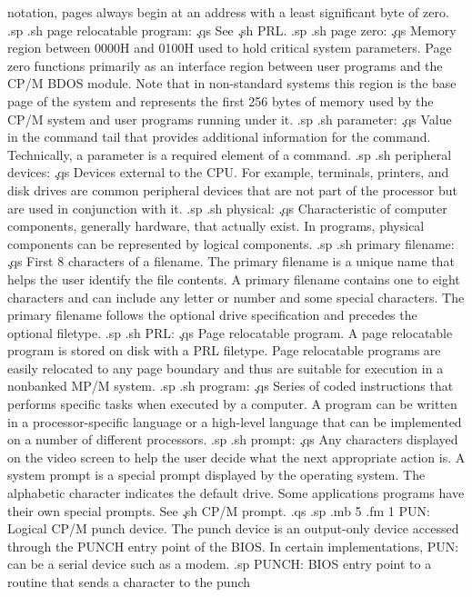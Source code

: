 notation, pages always begin at an address with a least 
significant byte of zero.
.sp
.sh
page relocatable program:  \c
.qs
See \c
.sh
PRL.
.sp
.sh
page zero:  \c
.qs
Memory region between 0000H and 0100H used to hold critical 
system parameters.  Page zero functions primarily as an interface 
region between user programs and the CP/M BDOS module.  Note that 
in non-standard systems this region is the base page of the 
system and represents the first 256 bytes of memory used by the 
CP/M system and user programs running under it.
.sp
.sh
parameter:  \c
.qs
Value in the command tail that provides additional information 
for the command.  Technically, a parameter is a required element 
of a command.
.sp
.sh
peripheral devices:  \c
.qs
Devices external to the CPU.  For example, terminals, printers, 
and disk drives are common peripheral devices that are not part 
of the processor but are used in conjunction with it.
.sp
.sh
physical:  \c
.qs
Characteristic of computer components, generally hardware, that 
actually exist.  In programs, physical components can be 
represented by logical components.
.sp
.sh
primary filename:  \c
.qs
First 8 characters of a filename.  The primary filename is a 
unique name that helps the user identify the file contents.  A 
primary filename contains one to eight characters and can include any 
letter or number and some special characters.  The primary 
filename follows the optional drive specification and precedes 
the optional filetype.
.sp
.sh
PRL:  \c
.qs
Page relocatable program.  A page relocatable program is stored 
on disk with a PRL filetype.  Page relocatable programs are 
easily relocated to any page boundary and thus are suitable for 
execution in a nonbanked MP/M system.
.sp
.sh
program:  \c
.qs
Series of coded instructions that performs specific tasks when 
executed by a computer.  A program can be written in a 
processor-specific language or a high-level language that can be 
implemented on a number of different processors.
.sp
.sh
prompt:  \c
.qs
Any characters displayed on the video screen to help the user 
decide what the next appropriate action is.  A system prompt is a 
special prompt displayed by the operating 
system.  The alphabetic character indicates the default drive.  Some 
applications programs have their own special prompts.  See \c
.sh
CP/M prompt.
.qs
.sp
.mb 5
.fm 1
PUN: 
Logical CP/M punch device.  The punch device is an output-only 
device accessed through the PUNCH entry point of the BIOS.  In 
certain implementations, PUN: can be a serial device such as a 
modem. 
.sp
PUNCH: 
BIOS entry point to a routine that sends a character to the punch 
